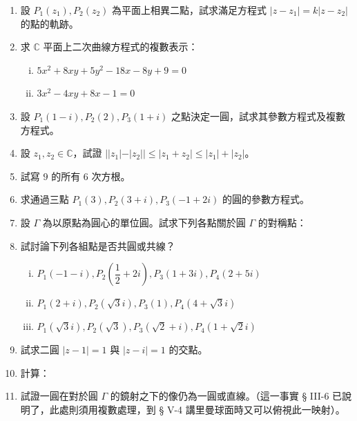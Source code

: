 \begin{enumerate}
  \item 設 $P_1(z_1), P_2(z_2)$ 為平面上相異二點，試求滿足方程式 $|z-z_1| = k|z-z_2|$ 的點的軌跡。
  \item 求 $\mathbb{C}$ 平面上二次曲線方程式的複數表示：
  \begin{enumerate}[(i)]
    \item $5x^2+8xy+5y^2-18x-8y+9=0$
    \item $3x^2-4xy+8x-1=0$
  \end{enumerate}
  \item 設 $P_1(1-i), P_2(2), P_3(1+i)$ 之點決定一圓，試求其參數方程式及複數方程式。
  \item 設 $z_1, z_2 \in \mathbb{C}$，試證 $||z_1|-|z_2|| \le |z_1+z_2| \le |z_1|+|z_2|$。
  \item 試寫 $9$ 的所有 $6$ 次方根。
  \item 求通過三點 $P_1(3), P_2(3+i), P_3(-1+2i)$ 的圓的參數方程式。
  \item[$^*$\theenumi.] 設 $\Gamma$ 為以原點為圓心的單位圓。試求下列各點關於圓 $\Gamma$ 的對稱點：
  \begin{enumerate}[(i)]
  \end{enumerate}
  \item[$^*$\theenumi.] 試討論下列各組點是否共圓或共線？
  \begin{enumerate}[(i)]
    \item $P_1(-1-i), P_2\left(\dfrac{1}{2}+2i\right), P_3(1+3i), P_4(2+5i)$
    \item $P_1(2+i), P_2(\sqrt{3}i), P_3(1), P_4(4+\sqrt{3}i)$
    \item $P_1(\sqrt{3}i), P_2(\sqrt{3}), P_3(\sqrt{2}+i), P_4(1+\sqrt{2}i)$
  \end{enumerate}
  \item 試求二圓 $|z-1|=1$ 與 $|z-i|=1$ 的交點。
  \item 計算：
  \begin{enumerate}[(i)]
  \end{enumerate}
  \item[$^*$\theenumi.] 試證一圓在對於圓 $\Gamma$ 的鏡射之下的像仍為一圓或直線。（這一事實 § III-6 已說明了，此處則須用複數處理，到 § V-4 講里曼球面時又可以俯視此一映射）。
\end{enumerate}


